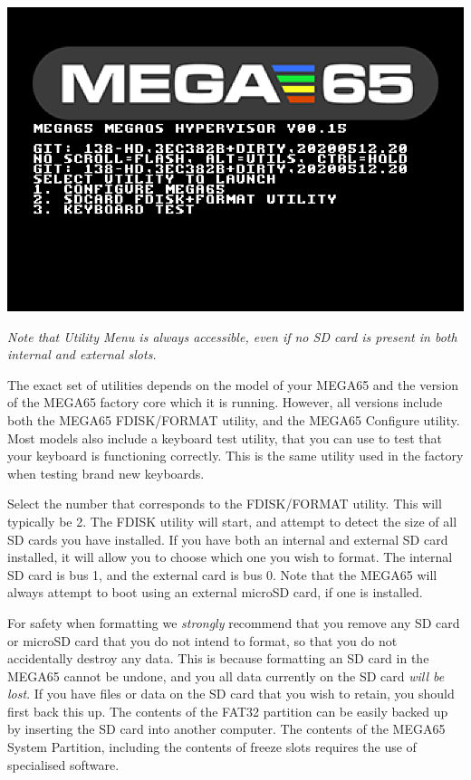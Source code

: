 \includegraphics[width=\linewidth]{images/ss-utilmenu.png}

{\em Note that Utility Menu is always accessible, even if no SD card is present in both internal and external slots.}

The exact set of utilities
depends on the model of your MEGA65 and the version of the MEGA65
factory core which it is running. However, all versions include both
the MEGA65 FDISK/FORMAT utility, and the MEGA65 Configure utility.
Most models also include a keyboard test utility, that you can use
to test that your keyboard is functioning correctly.  This is
the same utility used in the factory when testing brand
new keyboards.

Select the number that corresponds to the FDISK/FORMAT utility.  This
will typically be 2.  The FDISK utility will start, and attempt to
detect the size of all SD cards you have installed.  If you have both
an internal and external SD card installed, it will allow you to
choose which one you wish to format. The internal SD card is bus 1,
and the external card is bus 0.  Note that the MEGA65 will
always attempt to boot using an external microSD card, if one is
installed.

For safety when formatting we {\em strongly} recommend
that you remove any SD card or microSD card that you do not intend to
format, so that you do not accidentally destroy any data.  This is
because formatting an SD card in the MEGA65 cannot be undone, and you
all data currently on the SD card {\em will be lost}.  If you
have files or data on the SD card that you wish to retain, you
should first back this up.  The contents of the FAT32
partition can be easily backed up by inserting the SD card into
another computer.  The contents of the MEGA65 System Partition,
including the contents of freeze slots requires the use of specialised
software.

